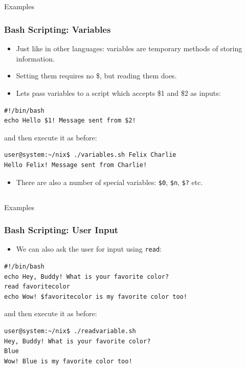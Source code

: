 \documentclass[10pt]{beamer}
\begin{document}
\subsection{}
\begin{frame}[fragile]{Examples}
\frametitle{Bash Scripting: Variables}
\begin{itemize}
\item Just like in other languages: variables are temporary methods of storing information.\vspace{0.1in}
\item Setting them requires no \$, but reading them does.\vspace{0.1in}
\item Lets pass variables to a script which accepts \$1 and \$2 as inputs:\vspace{0.1in}
\end{itemize}
\begin{lstlisting}[style=BashInputStyle]
#!/bin/bash
echo Hello $1! Message sent from $2!
\end{lstlisting}\vspace{0.1in}
\quad and then execute it as before:\vspace{0.1in}
\begin{lstlisting}[style=BashInputStyle]
user@system:~/nix$ ./variables.sh Felix Charlie
Hello Felix! Message sent from Charlie!
\end{lstlisting}\vspace{0.1in}
\begin{itemize}
\item There are also a number of special variables: \texttt{\$0}, \texttt{\$n}, \texttt{\$?} etc.
\end{itemize}
\end{frame}

\subsection{}
\begin{frame}[fragile]{Examples}
\frametitle{Bash Scripting: User Input}
\begin{itemize}
\item We can also ask the user for input using \texttt{read}:
\end{itemize}
\begin{lstlisting}[style=BashInputStyle]
#!/bin/bash
echo Hey, Buddy! What is your favorite color?
read favoritecolor
echo Wow! $favoritecolor is my favorite color too!
\end{lstlisting}\vspace{0.1in}
\quad and then execute it as before:\vspace{0.1in}
\begin{lstlisting}[style=BashInputStyle]
user@system:~/nix$ ./readvariable.sh
Hey, Buddy! What is your favorite color?
Blue
Wow! Blue is my favorite color too!
\end{lstlisting}\vspace{0.1in}
\end{frame}
\end{document}
